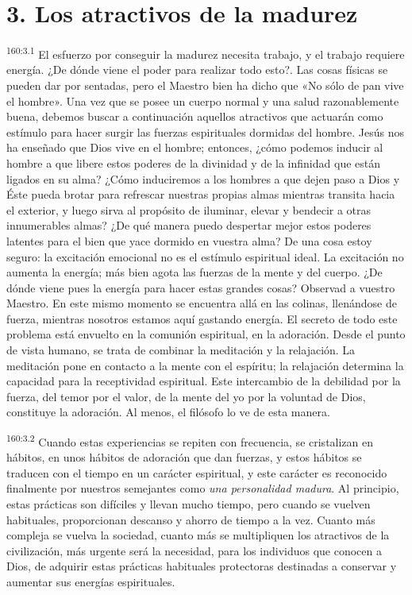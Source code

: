 \section*{3. Los atractivos de la madurez}
\par 
\textsuperscript{160:3.1} El esfuerzo por conseguir la madurez necesita trabajo, y el trabajo requiere energía. ¿De dónde viene el poder para realizar todo esto?. Las cosas físicas se pueden dar por sentadas, pero el Maestro bien ha dicho que «No sólo de pan vive el hombre». Una vez que se posee un cuerpo normal y una salud razonablemente buena, debemos buscar a continuación aquellos atractivos que actuarán como estímulo para hacer surgir las fuerzas espirituales dormidas del hombre. Jesús nos ha enseñado que Dios vive en el hombre; entonces, ¿cómo podemos inducir al hombre a que libere estos poderes de la divinidad y de la infinidad que están ligados en su alma? ¿Cómo induciremos a los hombres a que dejen paso a Dios y Éste pueda brotar para refrescar nuestras propias almas mientras transita hacia el exterior, y luego sirva al propósito de iluminar, elevar y bendecir a otras innumerables almas? ¿De qué manera puedo despertar mejor estos poderes latentes para el bien que yace dormido en vuestra alma? De una cosa estoy seguro: la excitación emocional no es el estímulo espiritual ideal. La excitación no aumenta la energía; más bien agota las fuerzas de la mente y del cuerpo. ¿De dónde viene pues la energía para hacer estas grandes cosas? Observad a vuestro Maestro. En este mismo momento se encuentra allá en las colinas, llenándose de fuerza, mientras nosotros estamos aquí gastando energía. El secreto de todo este problema está envuelto en la comunión espiritual, en la adoración. Desde el punto de vista humano, se trata de combinar la meditación y la relajación. La meditación pone en contacto a la mente con el espíritu; la relajación determina la capacidad para la receptividad espiritual. Este intercambio de la debilidad por la fuerza, del temor por el valor, de la mente del yo por la voluntad de Dios, constituye la adoración. Al menos, el filósofo lo ve de esta manera.

\par 
\textsuperscript{160:3.2} Cuando estas experiencias se repiten con frecuencia, se cristalizan en hábitos, en unos hábitos de adoración que dan fuerzas, y estos hábitos se traducen con el tiempo en un carácter espiritual, y este carácter es reconocido finalmente por nuestros semejantes como \textit{una personalidad madura}. Al principio, estas prácticas son difíciles y llevan mucho tiempo, pero cuando se vuelven habituales, proporcionan descanso y ahorro de tiempo a la vez. Cuanto más compleja se vuelva la sociedad, cuanto más se multipliquen los atractivos de la civilización, más urgente será la necesidad, para los individuos que conocen a Dios, de adquirir estas prácticas habituales protectoras destinadas a conservar y aumentar sus energías espirituales.

